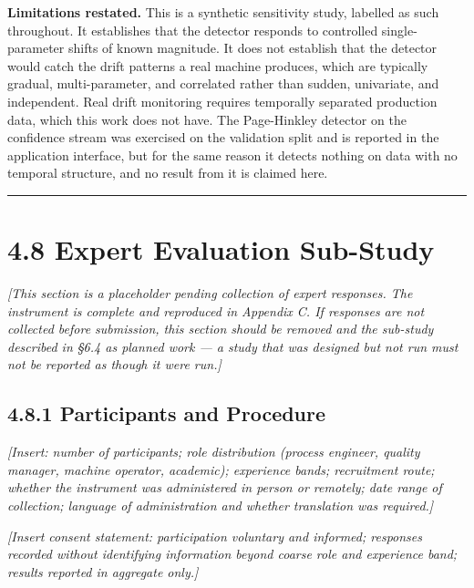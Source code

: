 \textbf{Limitations restated.} This is a synthetic sensitivity study, labelled as such throughout. It establishes that the detector responds to controlled single-parameter shifts of known magnitude. It does not establish that the detector would catch the drift patterns a real machine produces, which are typically gradual, multi-parameter, and correlated rather than sudden, univariate, and independent. Real drift monitoring requires temporally separated production data, which this work does not have. The Page-Hinkley detector on the confidence stream was exercised on the validation split and is reported in the application interface, but for the same reason it detects nothing on data with no temporal structure, and no result from it is claimed here.

\begin{center}\rule{0.5\linewidth}{0.5pt}\end{center}

\hypertarget{expert-evaluation-sub-study}{%
\section{4.8 Expert Evaluation Sub-Study}\label{expert-evaluation-sub-study}}

\emph{{[}This section is a placeholder pending collection of expert responses. The instrument is complete and reproduced in Appendix C. If responses are not collected before submission, this section should be removed and the sub-study described in §6.4 as planned work --- a study that was designed but not run must not be reported as though it were run.{]}}

\hypertarget{participants-and-procedure}{%
\subsection{4.8.1 Participants and Procedure}\label{participants-and-procedure}}

\emph{{[}Insert: number of participants; role distribution (process engineer, quality manager, machine operator, academic); experience bands; recruitment route; whether the instrument was administered in person or remotely; date range of collection; language of administration and whether translation was required.{]}}

\emph{{[}Insert consent statement: participation voluntary and informed; responses recorded without identifying information beyond coarse role and experience band; results reported in aggregate only.{]}}

